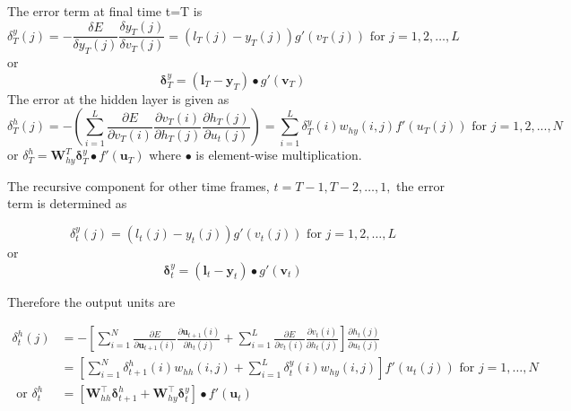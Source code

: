 The error term at final time t=T is
\begin{equation}
\delta^y_T(j)=-\frac{\delta E}{\delta y_T(j)}\frac{\delta y_T(j)}{\delta v_T(j)}=(l_T(j)-y_T(j))g'(v_T(j))\text{ for } j=1,2,\dots,L \label{eqn_c3_bptt04}\end{equation}
or
\begin{equation}
\mathbf{\delta}_T^y=(\mathbf{l}_T-\mathbf{y}_T)\bullet g'(\mathbf{v}_T) \label{eqn_c3_bptt05}\end{equation}
The error at the hidden layer is given as
\begin{equation}
\delta_T^h(j)=-\left(\sum_{i=1}^L\frac{\partial E}{\partial v_T(i)}\frac{\partial v_T(i)}{\partial h_T(j)}\frac{\partial h_T(j)}{\partial u_t(j)}\right)=\sum_{i=1}^L\delta_T^y(i)w_{hy}(i,j)f'(u_T(j))\text{ for } j=1,2,...,N \label{eqn_c3_bptt06}
\end{equation}
or $\delta_T^h=\mathbf{W}_{hy}^T\mathbf{\delta}_T^y\bullet f'(\mathbf{u}_T)$
where $\bullet$ is element-wise multiplication.

The recursive component for other time frames, $t=T-1, T-2, …, 1,$ the error term is determined as

\begin{equation}
\delta_t^y(j)=(l_t(j)-y_t(j))g'(v_t(j))\text{ for } j=1,2,\dots,L
\label{eqn_c3_bptt07}\end{equation}
or \begin{equation}
\mathbf{\delta}_t^y = (\mathbf{l}_t-\mathbf{y}_t)\bullet g'(\mathbf{v}_t) \label{eqn_c3_bptt08}\end{equation}

Therefore the output units are

\begin{equation}\begin{aligned}\delta_t^h(j)&=-\left[\sum_{i=1}^N\frac{\partial E}{\partial\mathbf{u}_{t+1}(i)}\frac{\partial\mathbf{u}_{t+1}(i)}{\partial h_t(j)}+\sum_{i=1}^L\frac{\partial E}{\partial v_t(i)}\frac{\partial v_t(i)}{\partial h_t(j)}\right]\frac{\partial h_t(j)}{\partial u_t(j)}\\ &=\left[\sum_{i=1}^N\delta_{t+1}^h(i)w_{hh}(i,j)+\sum_{i=1}^L\delta_t^y(i)w_{hy}(i,j)\right]f'(u_t(j)) \text{ for }j=1,\dots,N \\ \text{ or } \delta_t^h&=\left[\mathbf{W}_{hh}^\top\mathbf{\delta}_{t+1}^h+\mathbf{W}_{hy}^\top\mathbf{\delta}_t^y\right]\bullet f'(\mathbf{u}_t)\end{aligned}\label{eqn_c3_bptt09}\end{equation}

